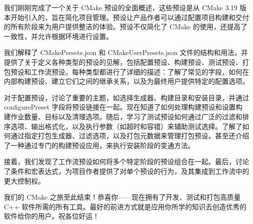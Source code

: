 我们刚刚完成了一个关于 CMake 预设的全面概述，这些预设是从 CMake 3.19 版本开始引入的，旨在简化项目管理。预设让产品作者可以通过配置项目构建和交付的所有阶段来为用户提供整洁的体验。预设不仅简化了 CMake 的使用，还提高了一致性，并允许根据环境进行设置。

我们解释了 CMakePresets.json 和 CMakeUserPresets.json 文件的结构和用法，并提供了关于定义各种类型的预设的见解，包括配置预设、构建预设、测试预设、打包预设和工作流预设。每种类型都进行了详细的描述：了解了常见的字段，如何在内部构建预设、建立它们之间的继承关系，以及为最终用户提供特定的配置选项。

对于配置预设，讨论了重要的主题，如选择生成器、构建目录和安装目录，并通过 configurePreset 字段将预设链接在一起。现在知道了如何处理构建预设和设置构建作业数量、目标以及清理选项。随后，学习了测试预设如何通过广泛的过滤和排序选项、输出格式化，以及执行参数（如超时和容错）来辅助测试选择。了解了如何通过指定打包生成器、过滤选项，以及打包元数据来管理打包预设。甚至还介绍了一种通过专门的构建预设应用，来执行安装阶段的变通方法。

接着，我们发现了工作流预设如何将多个特定阶段的预设组合在一起。最后，讨论了条件和宏表达式，为项目作者提供了对单个预设的行为，及其集成到工作流中的更大控制权。

我们的 CMake 之旅至此结束！恭喜你——现在拥有了开发、测试和打包高质量 C++ 软件所需的所有工具。最好的前进方式就是应用你所学的知识去创造优秀的软件给你的用户。祝各位好运！
